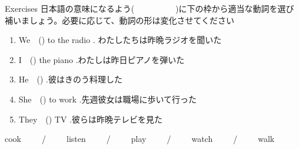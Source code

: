 \documentclass[aspectratio=169,xcolor={dvipsnames,table}]{beamer}
\newcommand{\myaudio}[1]{\href{#1}{\faVolumeUp}}
\begin{document}
\begin{frame}[plain]{Exercises}
日本語の意味になるよう(~~~~~~~~~~)に下の枠から適当な動詞を選び補いましょう。必要に応じて、動詞の形は変化させてください 

\begin{enumerate}
	\item We~~() to the radio . {\scriptsize わたしたちは昨晩ラジオを聞いた}        
 \item I~~() the piano .{\scriptsize わたしは昨日ピアノを弾いた}
	\item He~~() .{\scriptsize 彼はきのう料理した}
	\item She~~() to work .{\scriptsize 先週彼女は職場に歩いて行った}
	\item They~~() TV .{\scriptsize 彼らは昨晩テレビを見た}
\end{enumerate}

\begin{tcolorbox}[title=この中から選んでください]
\centering
cook~~~~~/~~~~~listen~~~~~/~~~~~play~~~~~/~~~~~watch~~~~~/~~~~~walk
\end{tcolorbox}
\hfill\myaudio{./audio/025_past_do_04.mp3}

\end{frame}
\end{document}
